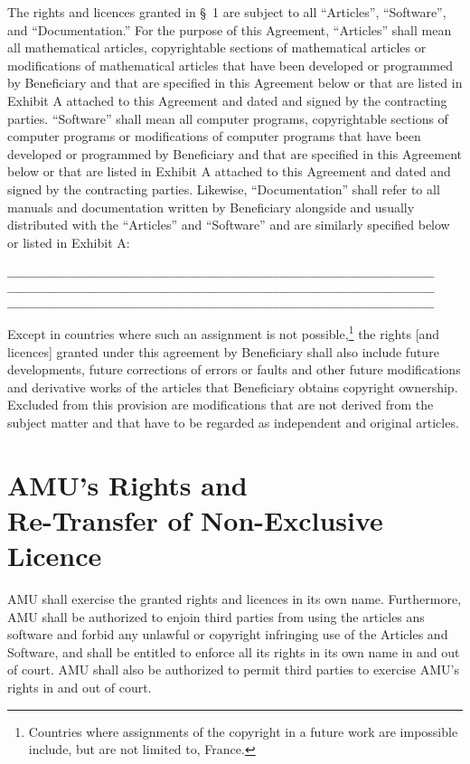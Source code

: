 The rights and licences granted in {\S}~1 are subject to all
``Articles'', ``Software'', and ``Documentation.'' For the purpose of this Agreement,
``Articles'' shall mean all mathematical articles, copyrightable sections
of mathematical articles or modifications of mathematical articles that have
been developed or programmed by Beneficiary and that are specified in
this Agreement below or that are listed in Exhibit A attached to this
Agreement and dated and signed by the contracting parties. 
``Software'' shall mean all computer programs, copyrightable sections
of computer programs or modifications of computer programs that have
been developed or programmed by Beneficiary and that are specified in
this Agreement below or that are listed in Exhibit A attached to this
Agreement and dated and signed by the contracting parties.
Likewise,
``Documentation'' shall refer to all manuals and documentation written
by Beneficiary alongside and usually distributed with the ``Articles''
and ``Software''
and are similarly specified below or listed in Exhibit A:
\begin{alltt}
    __________________________________________________________________
    __________________________________________________________________
    __________________________________________________________________
\end{alltt}
Except in countries where such an assignment is not
possible,\footnote{Countries where assignments of the copyright in a
future work are impossible include, but are not limited to, France.}
the rights [and licences] granted under this agreement by Beneficiary
shall also include future developments, future corrections of errors
or faults and other future modifications and derivative works of the
articles that Beneficiary obtains copyright ownership.  Excluded from
this provision are modifications that are not derived from the subject
matter and that have to be regarded as independent and original
articles. 

\section{AMU's Rights and \\Re-Transfer of Non-Exclusive Licence}
\A AMU shall exercise the granted rights and licences in its
own name. Furthermore, AMU shall be authorized to enjoin third
parties from using the articles ans software and forbid any unlawful or copyright
infringing use of the Articles and Software, and shall be entitled to enforce all
its rights in its own name in and out of court. AMU shall also
be authorized to permit third parties to exercise AMU's rights
in and out of court.\\ 

